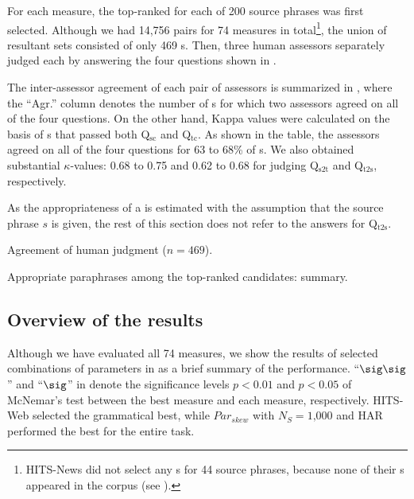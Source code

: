 \documentclass[english]{jnlp_1.4}
\begin{document}
For each measure, 
\pagebreak
the top-ranked {\pcp} for each of 200 source phrases
was first selected.  Although we had 14,756 pairs for 74 measures in
total\footnote{HITS-News did not select any {\pc}s for 44 source
  phrases, because none of their {\pc}s appeared in the corpus (see
  ).}, the union of resultant sets consisted of
only 469 {\pcp}s.
Then, three human assessors separately judged each {\pcp} by answering
the four questions shown in .

The inter-assessor agreement of each pair of assessors is summarized
in , where the ``Agr.'' column denotes the number of
{\pcp}s for which two assessors agreed on all of the four questions.
On the other hand, Kappa values were calculated on the basis of
{\pcp}s that passed both Q$_{\textrm{sc}}$ and Q$_{\textrm{tc}}$.
As shown in the table, the assessors agreed on all of the four
questions for 63 to 68\% of {\pcp}s.  We also obtained substantial
$\kappa$-values: 0.68 to 0.75 and 0.62 to 0.68 for judging
Q$_{\textrm{s2t}}$ and Q$_{\textrm{t2s}}$, respectively.


As the appropriateness of a {\pcp} is estimated with the assumption
that the source phrase $s$ is given, the rest of this section does not
refer to the answers for Q$_{\textrm{t2s}}$.

\begin{table}[t]
\caption{Agreement of human judgment ($n=\text{469}$).}
\label{tab:gen-judge}

\end{table}
\begin{table}[t]
\caption{Appropriate paraphrases among the top-ranked candidates:
  summary.}
\label{tab:gen-overview}

\end{table}


\subsection{Overview of the results}
\label{ssec:ev-gen-overview}

Although we have evaluated all 74 measures, we show the results of
selected combinations of parameters in  as a brief
summary of the performance.
``$\sig\sig$'' and ``$\sig$'' in  denote the
significance levels $p<\text{0.01}$ and $p<\text{0.05}$ of McNemar's
test between the best measure and each measure, respectively.
HITS-Web selected the grammatical {\pc} best, while
$\mathit{Par_{skew}}$ with $N_{S}=\text{1,000}$ and HAR performed the
best for the entire task.
\end{document}
